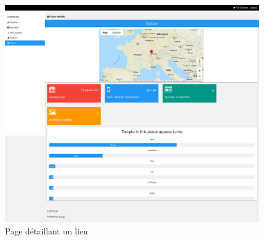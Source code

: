 \clearpage
\newpage
\thispagestyle{empty}
\begin{landscape}
    \centering
\thispagestyle{empty}
\begin{figure}[H]
	\includegraphics[width=0.84\linewidth]{images/dashboard/detailled_place.png}
	\caption{Page détaillant un lieu}
	\label{fig:dashboard_place}
\end{figure}
\end{landscape}